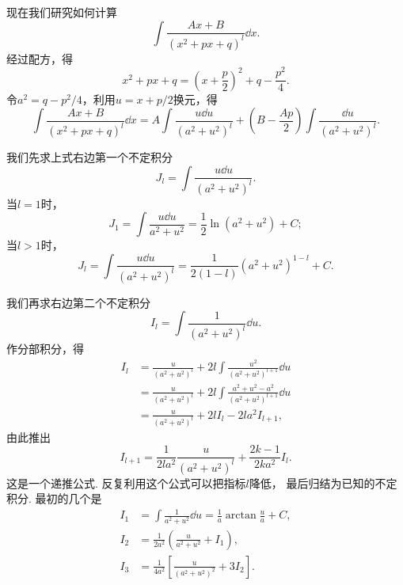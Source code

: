 现在我们研究如何计算\begin{equation*}
	\int \frac{Ax+B}{(x^2+px+q)^l} \dd{x}.
\end{equation*}
经过配方，得\begin{equation*}
	x^2+px+q = \left(x+\frac{p}{2}\right)^2 + q-\frac{p^2}{4}.
\end{equation*}
令\(a^2=q-p^2/4\)，利用\(u=x+p/2\)换元，得\begin{equation*}
	\int \frac{Ax+B}{(x^2+px+q)^l} \dd{x}
	= A \int \frac{u \dd{u}}{(a^2+u^2)^l}
	+ \left(B - \frac{Ap}{2}\right) \int \frac{\dd{u}}{(a^2+u^2)^l}.
\end{equation*}

我们先求上式右边第一个不定积分\begin{equation*}
	J_l = \int \frac{u \dd{u}}{(a^2+u^2)^l}.
\end{equation*}
当\(l=1\)时，\begin{equation*}
	J_1
	= \int \frac{u \dd{u}}{a^2+u^2}
	= \frac{1}{2} \ln(a^2+u^2) + C;
\end{equation*}
当\(l>1\)时，\begin{equation*}
	J_l
	= \int \frac{u \dd{u}}{(a^2+u^2)^l}
	= \frac{1}{2(1-l)} (a^2+u^2)^{1-l} + C.
\end{equation*}

我们再求右边第二个不定积分\begin{equation*}
	I_l = \int \frac{1}{(a^2+u^2)^l} \dd{u}.
\end{equation*}
作分部积分，得\begin{align*}
	I_l &= \frac{u}{(a^2+u^2)^l} + 2l \int \frac{u^2}{(a^2+u^2)^{l+1}} \dd{u} \\
	&= \frac{u}{(a^2+u^2)^l} + 2l \int \frac{a^2+u^2-a^2}{(a^2+u^2)^{l+1}} \dd{u} \\
	&= \frac{u}{(a^2+u^2)^l} + 2l I_l - 2la^2 I_{l+1},
\end{align*}
由此推出\begin{equation*}
	I_{l+1} = \frac{1}{2la^2} \frac{u}{(a^2+u^2)^l} + \frac{2k-1}{2ka^2} I_l.
\end{equation*}
这是一个递推公式.
反复利用这个公式可以把指标\(l\)降低，
最后归结为已知的不定积分.
最初的几个是\begin{align*}
	I_1 &= \int \frac{1}{a^2+u^2} \dd{u} = \frac{1}{a} \arctan\frac{u}{a} + C, \\
	I_2 &= \frac{1}{2a^2} \left( \frac{u}{a^2+u^2} + I_1 \right), \\
	I_3 &= \frac{1}{4a^2} \left[ \frac{u}{(a^2+u^2)^2} + 3 I_2 \right].
\end{align*}

